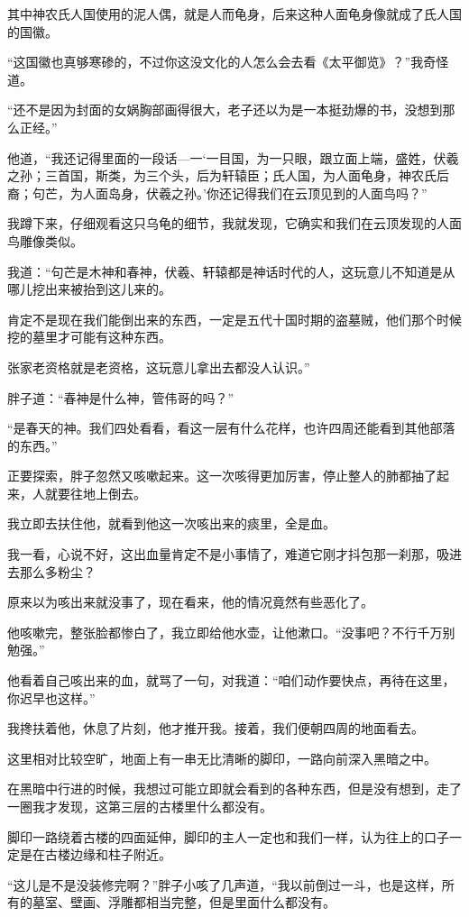 其中神农氏人国使用的泥人偶，就是人而龟身，后来这种人面龟身像就成了氏人国的国徽。

“这国徽也真够寒碜的，不过你这没文化的人怎么会去看《太平御览》？”我奇怪道。

“还不是因为封面的女娲胸部画得很大，老子还以为是一本挺劲爆的书，没想到那么正经。”

他道，“我还记得里面的一段话—一‘一目国，为一只眼，跟立面上端，盛姓，伏羲之孙；三首国，斯类，为三个头，后为轩辕臣；氏人国，为人面龟身，神农氏后裔；句芒，为人面岛身，伏羲之孙。’你还记得我们在云顶见到的人面鸟吗？”

我蹲下来，仔细观看这只乌龟的细节，我就发现，它确实和我们在云顶发现的人面鸟雕像类似。

我道：“句芒是木神和春神，伏羲、轩辕都是神话时代的人，这玩意儿不知道是从哪儿挖出来被抬到这儿来的。

肯定不是现在我们能倒出来的东西，一定是五代十国时期的盗墓贼，他们那个时候挖的墓里才可能有这种东西。

张家老资格就是老资格，这玩意儿拿出去都没人认识。”

胖子道：“春神是什么神，管伟哥的吗？”

“是春天的神。我们四处看看，看这一层有什么花样，也许四周还能看到其他部落的东西。”

正要探索，胖子忽然又咳嗽起来。这一次咳得更加厉害，停止整人的肺都抽了起来，人就要往地上倒去。

我立即去扶住他，就看到他这一次咳出来的痰里，全是血。

我一看，心说不好，这出血量肯定不是小事情了，难道它刚才抖包那一刹那，吸进去那么多粉尘？

原来以为咳出来就没事了，现在看来，他的情况竟然有些恶化了。

他咳嗽完，整张脸都惨白了，我立即给他水壶，让他漱口。“没事吧？不行千万别勉强。”

他看着自己咳出来的血，就骂了一句，对我道：“咱们动作要快点，再待在这里，你迟早也这样。”

我搀扶着他，休息了片刻，他才推开我。接着，我们便朝四周的地面看去。

这里相对比较空旷，地面上有一串无比清晰的脚印，一路向前深入黑暗之中。

在黑暗中行进的时候，我想过可能立即就会看到的各种东西，但是没有想到，走了一圈我才发现，这第三层的古楼里什么都没有。

脚印一路绕着古楼的四面延伸，脚印的主人一定也和我们一样，认为往上的口子一定是在古楼边缘和柱子附近。

“这儿是不是没装修完啊？”胖子小咳了几声道，“我以前倒过一斗，也是这样，所有的墓室、壁画、浮雕都相当完整，但是里面什么都没有。

